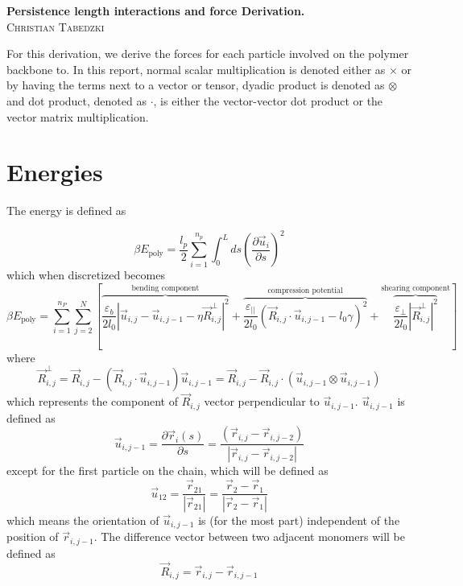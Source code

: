 \documentclass{article}
\renewcommand{\ij}{_{i,j}}
\newcommand{\ijj}{_{i,j-1}}
\newcommand{\ijk}{_{i,j-2}}
\newcommand{\magn}[1]{\left\vert #1 \right\vert }
\renewcommand{\part}[2]{\frac{\partial #1 }{\partial #2}}
\newcommand{\Rij}{\vec{R} \ij}
\newcommand{\uijj}{\vec{u} \ijj}
\begin{document}
\begin{center}
  \textbf{Persistence length interactions and force Derivation.}\\
  \textsc{Christian Tabedzki}
\end{center} 


For this derivation, we derive the forces for each particle involved on the polymer
backbone to. In this report, normal scalar multiplication is denoted either as
$\times$ or by having the terms next to a vector or tensor, dyadic product
is denoted as $\otimes$ and dot product, denoted as $\cdot$, is either the vector-vector dot product or the vector matrix multiplication.

\section{Energies}

The energy is defined as 

\begin{equation}
  \label{eqn:Energy_polymer}
  \beta E_{\text{poly}}  =  \frac{l_p}{2} \sum_{i=1}^{n_p} \int_0^L ds \left(\part{\vec{u}_i}{s}\right)^2
\end{equation}
which when discretized becomes
\begin{equation}
  \label{eqn:Energy_polymer_discrete}
  \beta E_{\text{poly}}  =  \sum_{i=1}^{n_P}  \sum_{j=2}^{N} \left[
  \overbrace{
  \frac{\varepsilon_b}{2 l_0}  \magn{ \vec{u} \ij - \vec{u} \ijj - \eta 
  \vec{R}\ij ^\bot} ^2 
  }^{\text{bending component}}
  +
\overbrace{
  \frac{\varepsilon_{\vert \vert}}{2 l_0} 
  \left( \vec{R}\ij \cdot \vec{u} \ijj - l_0 \gamma \right)^2 
  }^{\text{compression potential}}
  +
  \overbrace{
  \frac{\varepsilon _\perp}
  {2l_0} \magn{\vec{R}\ij ^\perp}^2
  }^{\text{shearing component}}
  \right]
\end{equation}
where 
\[
\vec{R}\ij  ^\bot = \vec{R} \ij - \left(\vec{R} \ij \cdot \vec{u} \ijj \right)
\vec{u} \ijj  = \Rij - \Rij \cdot \left(
 \uijj \otimes \uijj  
\right)
\]
which represents the component of \(\vec{R} \ij\) vector perpendicular to \(\vec{u} \ijj \).
\(\vec{u} \ijj \) is defined as  
  \[
  \vec{u}_{i,j-1} = 
  \part{\vec{{}r}_i(s)}{s} = 
    \frac{\left( \vec{r}\ij-\vec{r}\ijk \right)}{\magn{\vec{r}\ij - \vec{r}\ijk}} \]
except for the first particle on the chain, which will be defined as 
\[
  \vec{u}_{12} = \frac{\vec{r}_{21}}{\magn{\vec{r}_{21}}} = 
  \frac{\vec{r}_2 - \vec{r}_1}{\magn{\vec{r}_2 - \vec{r}_1}}
\]
which means the orientation of \(\vec{u}_{i,j-1}\) is (for the most part)
independent of the position of \(\vec{r}\ijj\). The difference vector between
two adjacent monomers will be defined as  
\[\vec{R} \ij = \vec{r} \ij - \vec{r} \ijj \]
\end{document}
